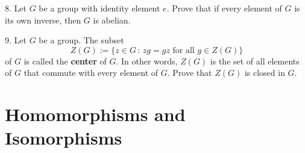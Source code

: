 \documentclass[10pt,openany,oneside]{book}
\newcommand{\terminology}[1]{\textbf{#1}}
\theoremstyle{plain}
\theoremstyle{definition}
\theoremstyle{definition}
\theoremstyle{definition}
\theoremstyle{definition}
\numberwithin{equation}{section}
\begin{document}
\begin{exerciselist}
\begin{enumerate}[label=(\alph*)]
\end{enumerate}
%
\par\smallskip
\item[8.]\hypertarget{exercise-19}{}Let \(G\) be a group with identity element \(e\). Prove that if every element of \(G\) is its own inverse, then \(G\) is abelian.%
\par\smallskip
\item[9.]\hypertarget{zgdef}{}\label{notation-46}
 Let \(G\) be a group. The subset%
\begin{equation*}
Z(G):=\{z \in G\,:\, zg=gz \mbox{ for all } g\in Z(G)\}
\end{equation*}
of \(G\) is called the \terminology{center} of \(G\). In other words, \(Z(G)\) is the set of all elements of \(G\) that commute with every element of \(G\). Prove that \(Z(G)\) is closed in \(G\).%
\par\smallskip
\end{exerciselist}
\typeout{************************************************}
\typeout{************************************************}
\chapter[{Homomorphisms and Isomorphisms}]{Homomorphisms and Isomorphisms}\label{homoiso}
\typeout{************************************************}
\typeout{************************************************}
\end{document}
